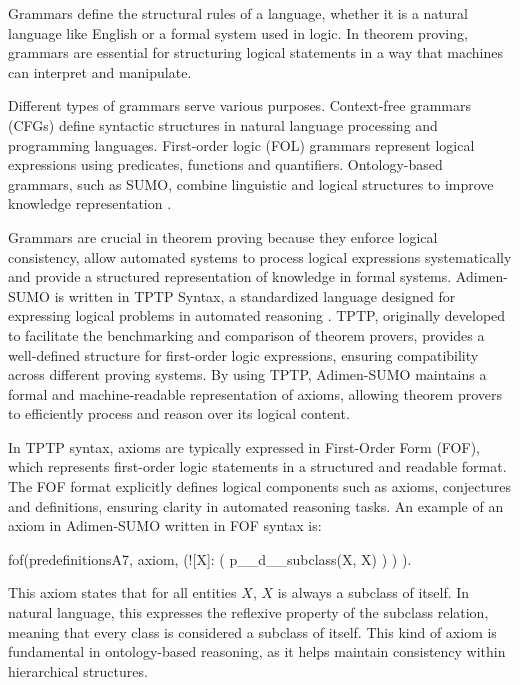 \documentclass[english,version-2020-11]{uzl-thesis}
\begin{document}
Grammars define the structural rules of a language, whether it is a natural language like English or a formal system used in logic. In theorem proving, grammars are essential for structuring logical statements in a way that machines can interpret and manipulate.

Different types of grammars serve various purposes. Context-free grammars (CFGs) define syntactic structures in natural language processing and programming languages. First-order logic (FOL) grammars represent logical expressions using predicates, functions and quantifiers. Ontology-based grammars, such as SUMO, combine linguistic and logical structures to improve knowledge representation \cite{Niles2001}.

Grammars are crucial in theorem proving because they enforce logical consistency, allow automated systems to process logical expressions systematically and provide a structured representation of knowledge in formal systems. Adimen-SUMO is written in TPTP Syntax, a standardized language designed for expressing logical problems in automated reasoning \cite{Alvez2014}. TPTP, originally developed to facilitate the benchmarking and comparison of theorem provers, provides a well-defined structure for first-order logic expressions, ensuring compatibility across different proving systems. By using TPTP, Adimen-SUMO maintains a formal and machine-readable representation of axioms, allowing theorem provers to efficiently process and reason over its logical content.

In TPTP syntax, axioms are typically expressed in First-Order Form (FOF), which represents first-order logic statements in a structured and readable format. The FOF format explicitly defines logical components such as axioms, conjectures and definitions, ensuring clarity in automated reasoning tasks. An example of an axiom in Adimen-SUMO written in FOF syntax is:


\begin{Pseudocode}[morekeywords = {add, create}, deletekeywords={to}, numbers=left,
    caption = {Axiom example Adimen-SUMO}]
    fof(predefinitionsA7, axiom,
        (![X]: 
            (
                p__d__subclass(X, X)
            )
        )
    ).
\end{Pseudocode}

This axiom states that for all entities \( X \), \( X \) is always a subclass of itself. In natural language, this expresses the reflexive property of the subclass relation, meaning that every class is considered a subclass of itself. This kind of axiom is fundamental in ontology-based reasoning, as it helps maintain consistency within hierarchical structures.
\end{document}
